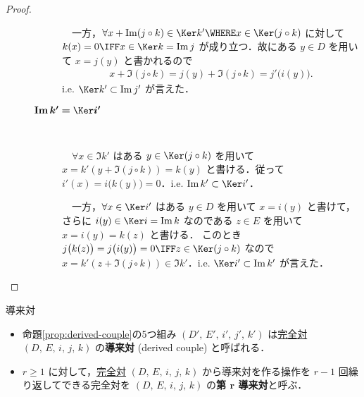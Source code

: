 \documentclass[algtopo_main]{subfiles}
\begin{document}
\begin{proof}
\begin{description}
\begin{description}
            　一方，$\forall x + \Im(j\circ k) \in \Ker k' \WHERE x \in \Ker (j \circ k)$ に対して $k(x) = 0 \IFF x \in \Ker k = \Im j$ が成り立つ．故にある $y \in D$ を用いて $x = j(y)$ と書かれるので
            \begin{align}
                x + \Im (j\circ k) = j(y) + \Im (j \circ k) = j' \bigl( i(y) \bigr).
            \end{align}
            i.e. $\Ker k' \subset \Im j'$ が言えた．
            \item[$\bm{\mathrm{Im}\, k' = \Ker i'}$]　
            
            　$\forall x \in \Im k'$ はある $y \in \Ker (j\circ k)$ を用いて $x = k'(y + \Im (j \circ k)) = k(y)$ と書ける．従って $i'(x) = i \bigl( k(y) \bigr) = 0$．i.e. $\Im k' \subset \Ker i'$．
            
            　一方，$\forall x \in \Ker i'$ はある $y \in D$ を用いて $x = i(y)$ と書けて，さらに $i(y) \in \Ker i = \Im k$ なのである $z \in E$ を用いて $x = i(y) = k(z)$ と書ける．
            このとき $j \bigl( k(z) \bigr) =j \bigl( i(y) \bigr) = 0 \IFF z \in \Ker (j \circ k)$ なので $x = k' (z + \Im (j \circ k)) \in \Im k'$．i.e. $\Ker i' \subset \Im k'$ が言えた．
        \end{description}
    \end{description}
\end{proof}

\begin{mydef}[label=def:DC]{導来対}
    \begin{itemize}
        \item 命題\ref{prop:derived-couple}の5つ組み  $(D',\, E',\, i',\, j',\, k')$ は\hyperref[def:exact-couple]{完全対} $(D,\, E,\, i,\, j,\, k)$ の\textbf{導来対} (derived couple) と呼ばれる．
        \item $r \ge 1$ に対して，\hyperref[def:exact-couple]{完全対} $(D,\, E,\, i,\, j,\, k)$ から導来対を作る操作を $r - 1$ 回繰り返してできる完全対を $(D,\, E,\, i,\, j,\, k)$ の\textbf{第 $\bm{r}$ 導来対}と呼ぶ．
    \end{itemize}
\end{mydef}
\end{document}
